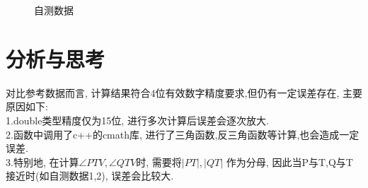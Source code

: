 \documentclass[12pt,a4paper,oneside]{article}
\begin{document}
\begin{figure}[H]
    \hspace{0.5in}
    \hspace{0.5in}
    \caption{自测数据}
\end{figure}

\section{分析与思考}\noindent
对比参考数据而言, 计算结果符合4位有效数字精度要求,但仍有一定误差存在, 主要原因如下:\\

\noindent1.double类型精度仅为15位, 进行多次计算后误差会逐次放大.\\
2.函数中调用了c++的cmath库, 进行了三角函数,反三角函数等计算,也会造成一定误差.\\
3.特别地, 在计算$\angle PTV, \angle QTV$时, 需要将$\lvert PT\rvert, \lvert QT \rvert$
作为分母, 因此当P与T,Q与T接近时(如自测数据1,2), 误差会比较大.
\end{document}
